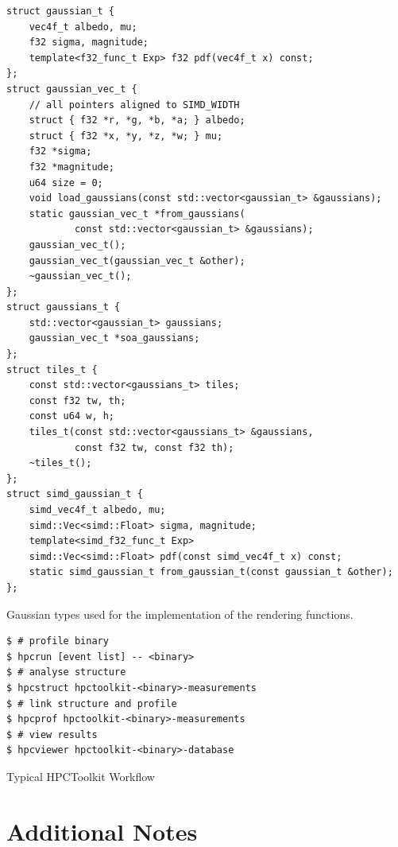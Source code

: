 \documentclass[a4paper, 11pt]{memoir}
\begin{document}
    \begin{listing}[ht]
        \begin{verbatim}
struct gaussian_t {
    vec4f_t albedo, mu;
    f32 sigma, magnitude;
    template<f32_func_t Exp> f32 pdf(vec4f_t x) const;
};
struct gaussian_vec_t {
    // all pointers aligned to SIMD_WIDTH
    struct { f32 *r, *g, *b, *a; } albedo;
    struct { f32 *x, *y, *z, *w; } mu;
    f32 *sigma;
    f32 *magnitude;
    u64 size = 0;
    void load_gaussians(const std::vector<gaussian_t> &gaussians);
    static gaussian_vec_t *from_gaussians(
            const std::vector<gaussian_t> &gaussians);
    gaussian_vec_t();
    gaussian_vec_t(gaussian_vec_t &other);
    ~gaussian_vec_t();
};
struct gaussians_t {
    std::vector<gaussian_t> gaussians;
    gaussian_vec_t *soa_gaussians;
};
struct tiles_t {
    const std::vector<gaussians_t> tiles;
    const f32 tw, th;
    const u64 w, h;
    tiles_t(const std::vector<gaussians_t> &gaussians,
            const f32 tw, const f32 th);
    ~tiles_t();
};
struct simd_gaussian_t {
    simd_vec4f_t albedo, mu;
    simd::Vec<simd::Float> sigma, magnitude;
    template<simd_f32_func_t Exp>
    simd::Vec<simd::Float> pdf(const simd_vec4f_t x) const;
    static simd_gaussian_t from_gaussian_t(const gaussian_t &other);
};
        \end{verbatim}
        \caption{Gaussian types used for the implementation of the rendering functions.}
        \label{lst:gaussian_types_vrt_full}
    \end{listing}
    
    \begin{listing}[ht]
        \begin{verbatim}
$ # profile binary
$ hpcrun [event list] -- <binary>
$ # analyse structure
$ hpcstruct hpctoolkit-<binary>-measurements
$ # link structure and profile
$ hpcprof hpctoolkit-<binary>-measurements
$ # view results
$ hpcviewer hpctoolkit-<binary>-database
        \end{verbatim}
        \caption{Typical HPCToolkit Workflow}
        \label{lst:hpctoolkit_workflow}
    \end{listing}

    \chapter{Additional Notes}
\end{document}
